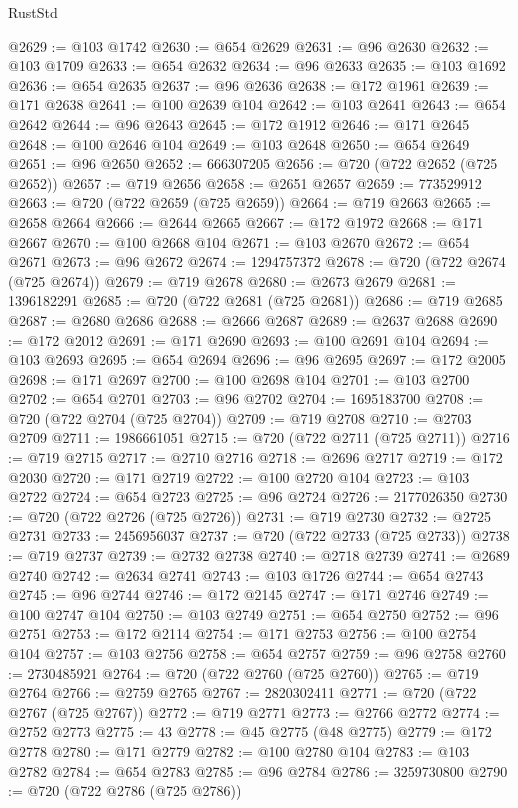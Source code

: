 \begin{lexlean}{RustStd}
\begin{coremodule}
@2629 := @103 @1742
@2630 := @654 @2629
@2631 := @96 @2630
@2632 := @103 @1709
@2633 := @654 @2632
@2634 := @96 @2633
@2635 := @103 @1692
@2636 := @654 @2635
@2637 := @96 @2636
@2638 := @172 @1961
@2639 := @171 @2638
@2641 := @100 @2639 @104
@2642 := @103 @2641
@2643 := @654 @2642
@2644 := @96 @2643
@2645 := @172 @1912
@2646 := @171 @2645
@2648 := @100 @2646 @104
@2649 := @103 @2648
@2650 := @654 @2649
@2651 := @96 @2650
@2652 := 666307205
@2656 := @720 (@722 @2652 (@725 @2652))
@2657 := @719 @2656
@2658 := @2651 @2657
@2659 := 773529912
@2663 := @720 (@722 @2659 (@725 @2659))
@2664 := @719 @2663
@2665 := @2658 @2664
@2666 := @2644 @2665
@2667 := @172 @1972
@2668 := @171 @2667
@2670 := @100 @2668 @104
@2671 := @103 @2670
@2672 := @654 @2671
@2673 := @96 @2672
@2674 := 1294757372
@2678 := @720 (@722 @2674 (@725 @2674))
@2679 := @719 @2678
@2680 := @2673 @2679
@2681 := 1396182291
@2685 := @720 (@722 @2681 (@725 @2681))
@2686 := @719 @2685
@2687 := @2680 @2686
@2688 := @2666 @2687
@2689 := @2637 @2688
@2690 := @172 @2012
@2691 := @171 @2690
@2693 := @100 @2691 @104
@2694 := @103 @2693
@2695 := @654 @2694
@2696 := @96 @2695
@2697 := @172 @2005
@2698 := @171 @2697
@2700 := @100 @2698 @104
@2701 := @103 @2700
@2702 := @654 @2701
@2703 := @96 @2702
@2704 := 1695183700
@2708 := @720 (@722 @2704 (@725 @2704))
@2709 := @719 @2708
@2710 := @2703 @2709
@2711 := 1986661051
@2715 := @720 (@722 @2711 (@725 @2711))
@2716 := @719 @2715
@2717 := @2710 @2716
@2718 := @2696 @2717
@2719 := @172 @2030
@2720 := @171 @2719
@2722 := @100 @2720 @104
@2723 := @103 @2722
@2724 := @654 @2723
@2725 := @96 @2724
@2726 := 2177026350
@2730 := @720 (@722 @2726 (@725 @2726))
@2731 := @719 @2730
@2732 := @2725 @2731
@2733 := 2456956037
@2737 := @720 (@722 @2733 (@725 @2733))
@2738 := @719 @2737
@2739 := @2732 @2738
@2740 := @2718 @2739
@2741 := @2689 @2740
@2742 := @2634 @2741
@2743 := @103 @1726
@2744 := @654 @2743
@2745 := @96 @2744
@2746 := @172 @2145
@2747 := @171 @2746
@2749 := @100 @2747 @104
@2750 := @103 @2749
@2751 := @654 @2750
@2752 := @96 @2751
@2753 := @172 @2114
@2754 := @171 @2753
@2756 := @100 @2754 @104
@2757 := @103 @2756
@2758 := @654 @2757
@2759 := @96 @2758
@2760 := 2730485921
@2764 := @720 (@722 @2760 (@725 @2760))
@2765 := @719 @2764
@2766 := @2759 @2765
@2767 := 2820302411
@2771 := @720 (@722 @2767 (@725 @2767))
@2772 := @719 @2771
@2773 := @2766 @2772
@2774 := @2752 @2773
@2775 := 43
@2778 := @45 @2775 (@48 @2775)
@2779 := @172 @2778
@2780 := @171 @2779
@2782 := @100 @2780 @104
@2783 := @103 @2782
@2784 := @654 @2783
@2785 := @96 @2784
@2786 := 3259730800
@2790 := @720 (@722 @2786 (@725 @2786))

\end{coremodule}
\end{lexlean}

